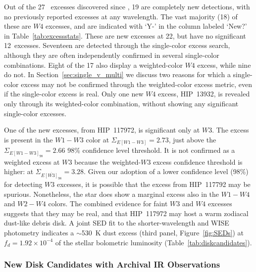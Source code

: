     
Out of the 27 %
\WS\ excesses discovered since , 19 %
are completely new detections, with no previously reported excesses at any wavelength.  The vast majority (18) %
of these are $W4$ excesses, and are indicated with `Y-' in the column labeled `New?' in Table~\ref{tab:excessstats}. These are new excesses at 22\micron, but have no significant 12\micron\ excesses.  Seventeen %
are detected through the single-color excess search, although they are often independently confirmed in several single-color combinations.  Eight of the 17 %
also display a weighted-color $W4$ excess, while nine %
do not.  In Section~\ref{sec:single_v_multi} we discuss two reasons for which a single-color excess may not be confirmed through the weighted-color excess metric, even if the single-color excess is real.  Only one new $W4$ excess, HIP~13932, is revealed only through its weighted-color combination, without showing any significant single-color excesses.    

One of the new excesses, from HIP~117972, is significant only at $W3$.  The excess is present in the $W1-W3$ color at $\Sigma_{E[W1-W3]}=2.73$, just above the $\Sigma_{E[W1-W3]_{98}}=2.66$ 98\% confidence level threshold.  It is not confirmed as a weighted excess at $W3$ because the weighted-$W3$ excess confidence threshold is higher: at $\Sigma_{\overline{E[W3]_{98}}}=3.28$.  Given our adoption of a lower confidence level (98\%) for detecting $W3$ excesses, it is possible that the excess from HIP~117792 may be spurious.  Nonetheless, the star does show a marginal excess also in the $W1-W4$ and $W2-W4$ colors.  The combined evidence for faint $W3$ and $W4$ excesses suggests that they may be real, and that HIP~117972 may host a warm zodiacal dust-like debris disk.  A joint SED fit to the shorter-wavelength and WISE photometry indicates a $\sim$530~K dust excess (third panel, Figure~\ref{fig:SEDs}) at $f_d=1.92\times10^{-4}$ of the stellar bolometric luminosity (Table~\ref{tab:diskcandidates}).


	\subsubsection{New Disk Candidates with Archival IR Observations}\label{sec:newdisk_archival}

